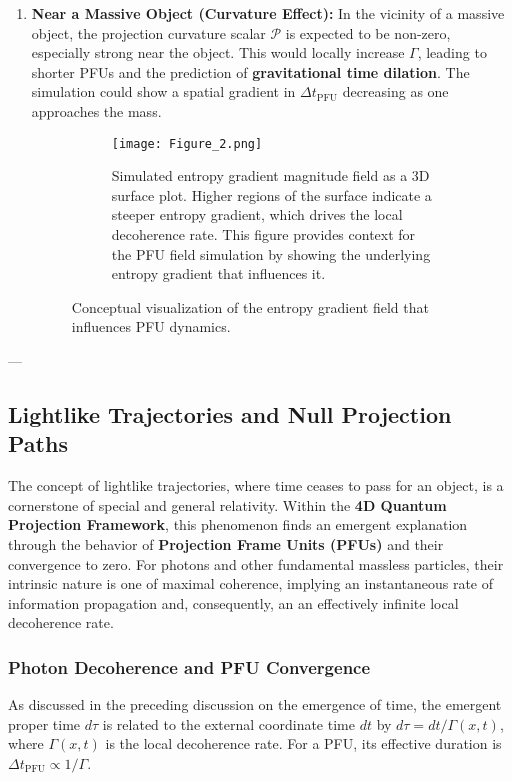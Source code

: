 \documentclass[12pt,a4paper]{article}
\numberwithin{equation}{section}
\begin{document}
\begin{enumerate}
    \item \textbf{Near a Massive Object (Curvature Effect):} In the vicinity of a massive object, the projection curvature scalar $\mathcal{P}$ is expected to be non-zero, especially strong near the object. This would locally increase $\Gamma$, leading to shorter PFUs and the prediction of \textbf{gravitational time dilation}. The simulation could show a spatial gradient in $\Delta t_{\text{PFU}}$ decreasing as one approaches the mass.
    \begin{figure}[H]
    \centering
    \begin{subfigure}[b]{0.8\textwidth}
        \centering
        \texttt{[image: Figure\_2.png]} %
        \caption{Simulated entropy gradient magnitude field as a 3D surface plot. Higher regions of the surface indicate a steeper entropy gradient, which drives the local decoherence rate. This figure provides context for the PFU field simulation by showing the underlying entropy gradient that influences it.}
        \label{fig:entropy_gradient_magnitude_surface}
    \end{subfigure}
    \caption{Conceptual visualization of the entropy gradient field that influences PFU dynamics.}
    \end{figure}
\end{enumerate}

---

\subsection{Lightlike Trajectories and Null Projection Paths}
The concept of lightlike trajectories, where time ceases to pass for an object, is a cornerstone of special and general relativity. Within the \textbf{4D Quantum Projection Framework}, this phenomenon finds an emergent explanation through the behavior of \textbf{Projection Frame Units (PFUs)} and their convergence to zero. For photons and other fundamental massless particles, their intrinsic nature is one of maximal coherence, implying an instantaneous rate of information propagation and, consequently, an an effectively infinite local decoherence rate.

\subsubsection{Photon Decoherence and PFU Convergence}
As discussed in the preceding discussion on the emergence of time, the emergent proper time $d\tau$ is related to the external coordinate time $dt$ by $d\tau = dt / \Gamma(x, t)$, where $\Gamma(x, t)$ is the local decoherence rate. For a PFU, its effective duration is $\Delta t_{\text{PFU}} \propto 1/\Gamma$.
\end{document}
